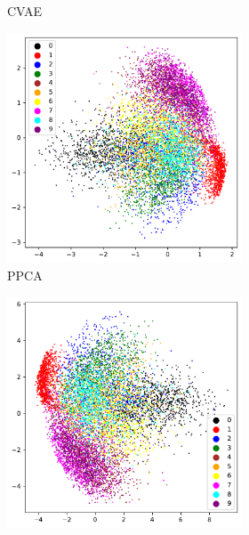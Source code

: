 \begin{figure}
\begin{floatrow}
{\begin{subfigure}[t]{0.45\textwidth}
\begin{subfigure}[t]{0.49\textwidth}
			\caption{CVAE}
			\label{fig:cvae:clustering}
		\end{subfigure}
		\begin{subfigure}[t]{0.49\textwidth}
			\centering
			\includegraphics[width = 1\textwidth]{figures/ppca/clustering}
			\caption{PPCA}
			\label{fig:ppca:clustering}
		\end{subfigure}
		\begin{subfigure}[t]{0.49\textwidth}
			\centering
			\includegraphics[width = 1\textwidth]{figures/gmm/clustering}

\end{subfigure}
\end{subfigure}}
\end{floatrow}
\end{figure}
